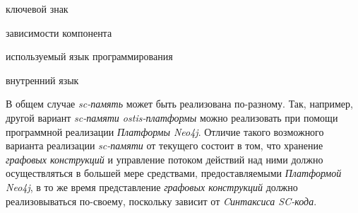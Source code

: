 \begin{SCn}
\begin{scnindent}
	\begin{scnreltolist}{ключевой знак}
	\end{scnreltolist}
    \begin{scnindent}
    \end{scnindent}
\end{scnindent}
\begin{scnrelfromset}{зависимости компонента}
\end{scnrelfromset}
\begin{scnrelfromlist}{используемый язык программирования}
\end{scnrelfromlist}
\begin{scnrelfromlist}{внутренний язык}
\end{scnrelfromlist}
\end{SCn}

В общем случае \textit{sc-память} может быть реализована по-разному. Так, например, другой вариант \textit{sc-памяти ostis-платформы} можно реализовать при помощи программной реализации \textit{Платформы Neo4j}. Отличие такого возможного варианта реализации \textit{sc-памяти} от текущего состоит в том, что хранение \textit{графовых конструкций} и управление потоком действий над ними должно осуществляться в большей мере средствами, предоставляемыми \textit{Платформой Neo4j}, в то же время представление \textit{графовых конструкций} должно реализовываться по-своему, поскольку зависит от \textit{Cинтаксиса SC-кода}.

